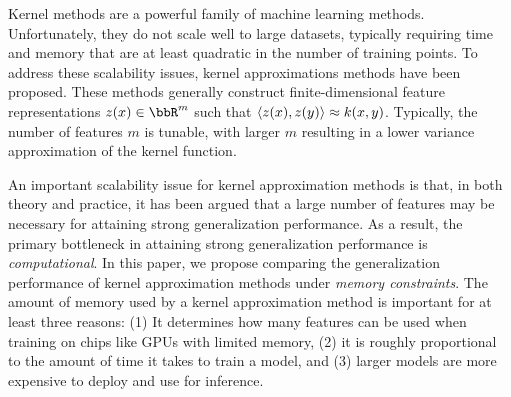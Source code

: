 Kernel methods are a powerful family of machine learning methods.  Unfortunately, they do not scale well to large datasets, typically requiring time and memory that are at least quadratic in the number of training points. To address these scalability issues, kernel approximations methods have been proposed. These methods generally construct finite-dimensional feature representations $z(x) \in \RR^m$ such that $\langle z(x),z(y) \rangle \approx k(x,y)$.  Typically, the number of features $m$ is tunable, with larger $m$ resulting in a lower variance approximation of the kernel function.  

An important scalability issue for kernel approximation methods is that, in both theory and practice, it has been argued that a large number of features may be necessary for attaining strong generalization performance. As a result, the primary bottleneck in attaining strong generalization performance is \emph{computational}. In this paper, we propose comparing the generalization performance of kernel approximation methods under \emph{memory constraints}. The amount of memory used by a kernel approximation method is important for at least three reasons: (1) It determines how many features can be used when training on chips like GPUs with limited memory, (2) it is roughly proportional to the amount of time it takes to train a model, and (3) larger models are more expensive to deploy and use for inference. 



